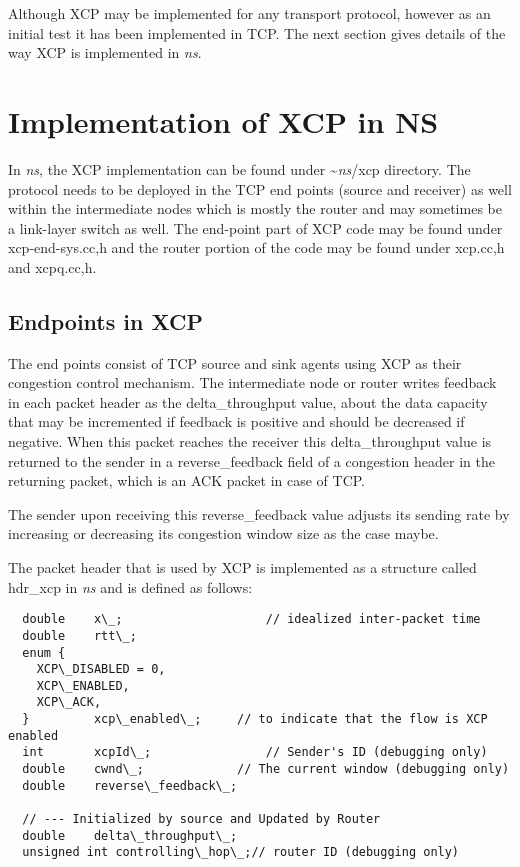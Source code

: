 Although XCP may be implemented for any transport protocol, however as an
initial test it has been implemented in TCP. The next section
gives details of the way XCP is implemented in \emph{ns}{}.


\section{Implementation of XCP in NS}
\label{sec:xcp in ns}

In \emph{ns}{}, the XCP implementation can be found under \textasciitilde\emph{ns}/{xcp} directory. 
The protocol needs to be deployed in the TCP end points (source and
receiver) as well within the intermediate nodes which is mostly the
router and may sometimes be a link-layer switch as well. The end-point
part of XCP code may be found under xcp-end-sys.{cc,h} and the router
portion of the code may be found under xcp.{cc,h} and xcpq.{cc,h}. 

\subsection{Endpoints in XCP}
\label{sec:endpoints}

The end points consist of TCP source and sink agents using XCP as their
congestion control mechanism. The
intermediate node or router writes feedback in each packet header as
the delta\_throughput value, about the data capacity that may be
incremented if feedback is positive and should be decreased if
negative. When this packet reaches the receiver this delta\_throughput
value is returned to the sender in a reverse\_feedback field of a
congestion header in the returning packet, which is an ACK packet in
case of TCP. 
  
The sender upon receiving this reverse\_feedback value adjusts its
sending rate by increasing or decreasing its congestion window size as
the case maybe. 

The packet header that is used by XCP is implemented as a structure
called hdr\_xcp in \emph{ns}{} and is defined as follows:
\begin{verbatim}
  double	x\_;					// idealized inter-packet time
  double	rtt\_;
  enum {
    XCP\_DISABLED = 0,
    XCP\_ENABLED,
    XCP\_ACK,
  } 		xcp\_enabled\_;		// to indicate that the flow is XCP enabled
  int	    xcpId\_;				// Sender's ID (debugging only)
  double	cwnd\_;				// The current window (debugging only) 
  double	reverse\_feedback\_; 
  
  // --- Initialized by source and Updated by Router 
  double 	delta\_throughput\_;
  unsigned int controlling\_hop\_;// router ID (debugging only)
\end{verbatim}
  
